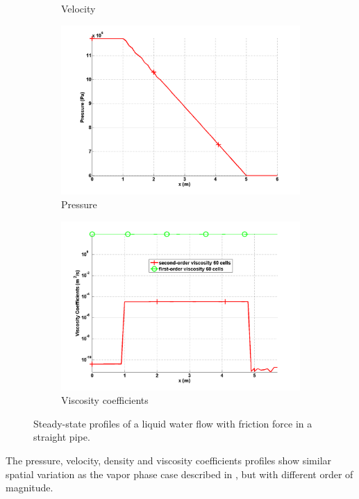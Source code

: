 \begin{figure}[H]
\begin{subfigure}[b]{0.495\textwidth}
                \caption{Velocity}
                \label{fig:1d-liquid-friction-velocity-sct3}
        \end{subfigure}

        \begin{subfigure}[b]{0.495\textwidth}
                \centering
                \includegraphics[width=\textwidth]{figures/liquid_friction_pressure_source_terms.png}
                \caption{Pressure}
                \label{fig:1d-liquid-friction-pressure-sct3}
        \end{subfigure}
        \begin{subfigure}[b]{0.495\textwidth}
                \centering
                \includegraphics[width=\textwidth]{figures/liquid_friction_viscosity_source_terms.png}
                \caption{Viscosity coefficients}
                \label{fig:1d-liquid-friction-visc-sct3}
        \end{subfigure}
        \caption{Steady-state profiles of a liquid water flow with friction force in a straight pipe.}
				\label{fig:1d-liquid-friction-sct3}
\end{figure}
%
The pressure, velocity, density and viscosity coefficients profiles show similar spatial variation as the vapor phase case described in , but with different order of magnitude.
